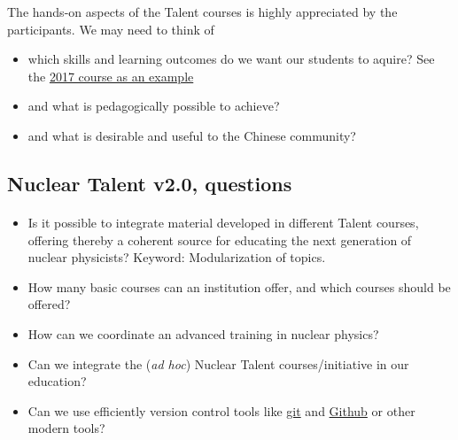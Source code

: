 \documentclass[%
oneside,                 %
final,                   %
10pt]{article}
\begin{document}
The hands-on aspects of the Talent courses is highly appreciated by the participants.  We may need to think of
\begin{itemize}
\item which skills and learning outcomes do we want our students to aquire? See the \href{{https://github.com/NuclearTalent/NuclearStructure}}{2017 course as an example}

\item and what is pedagogically possible to achieve?

\item and what is desirable and useful to the Chinese community? 
\end{itemize}

\noindent








\subsection*{Nuclear Talent v2.0, questions}

\paragraph{}
\begin{itemize}
\item Is it possible to integrate material developed in different Talent courses, offering thereby a coherent source for educating the next generation of nuclear physicists? Keyword: Modularization of topics.

\item How many basic courses can an institution offer, and which courses should be offered?

\item How can we  coordinate an advanced training in nuclear physics?

\item Can we integrate the (\emph{ad hoc}) Nuclear Talent courses/initiative  in our education?

\item Can we use efficiently version control tools  like \href{{https://git-scm.com/}}{git} and \href{{https://github.com/}}{Github} or other modern tools? 
\end{itemize}

\noindent
\end{document}
